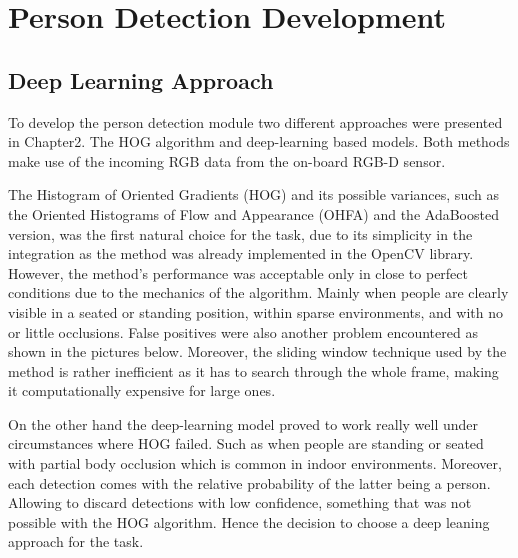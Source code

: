\chapter{Person Detection Development}
\label{chapter3}

\section{Deep Learning Approach}

To develop the person detection module two different approaches were presented in Chapter2. The HOG algorithm and deep-learning based models. Both methods make use of the incoming RGB data from the on-board RGB-D sensor.

The Histogram of Oriented Gradients (HOG) and its possible variances, such as the Oriented Histograms of Flow and Appearance (OHFA) and the AdaBoosted version, was the first natural choice for the task, due to its simplicity in the integration as the method was already implemented in the OpenCV library. However, the method's performance was acceptable only in close to perfect conditions due to the mechanics of the algorithm. Mainly when people are clearly visible in a seated or standing position, within sparse environments, and with no or little occlusions. False positives were also another problem encountered as shown in the pictures below. Moreover, the sliding window technique used by the method is rather inefficient as it has to search through the whole frame, making it computationally expensive for large ones.

On the other hand the deep-learning model proved to work really well under circumstances where HOG failed. Such as when people are standing or seated with partial body occlusion which is common in indoor environments. Moreover, each detection comes with the relative probability of the latter being a person. Allowing to discard detections with low confidence, something that was not possible with the HOG algorithm. Hence the decision to choose a deep leaning approach for the task.

